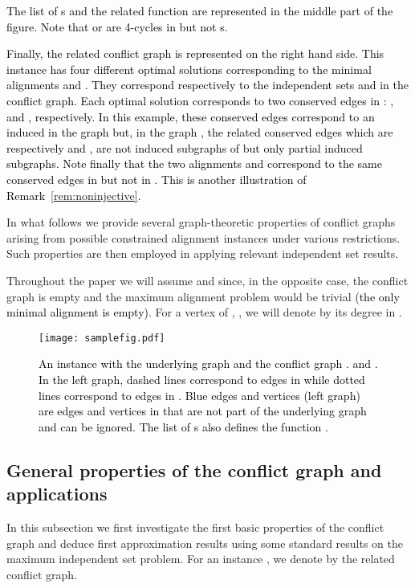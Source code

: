 \documentclass[final]{dmtcs-episciences}
\newcommand\mar[1]{\textcolor{black}{#1}}
\begin{document}
\mar{The list of s and the related function 
are represented in the middle part of the figure.
Note that  or  are 4-cycles in  but not s. }

\mar{Finally, the related conflict graph is represented on the right hand side. 
This instance has four different optimal solutions corresponding to the minimal alignments  and . They correspond respectively to the independent sets  and  in the conflict graph. Each optimal solution corresponds to two conserved edges in : ,  and , respectively. In this example, these conserved edges correspond to an induced  in the graph  but, in the graph , the related conserved edges which are respectively   and , are not induced subgraphs of  but only partial induced subgraphs. Note finally that the two alignments  and  correspond to the same conserved edges in  but not in . This is another illustration of Remark~\ref{rem:noninjective}.} 


In what follows we provide several graph-theoretic properties of conflict graphs
arising from possible constrained alignment instances under various restrictions. 
Such properties are then employed in applying relevant independent set 
results. 

Throughout the paper we will assume  and  since, in the opposite case, the conflict graph is empty and the maximum alignment problem would be trivial \mar{(the only minimal alignment is empty)}. For a vertex  of , , we will denote by  its degree in .

\begin{figure}[t]	   
\begin{center}	   
\texttt{[image: samplefig.pdf]} 
\caption{\sf \mar{An instance  with the underlying graph  and the conflict graph .  and . In the left graph, dashed lines correspond to edges in  while dotted lines correspond to edges in . Blue edges and vertices (left graph) are edges and vertices in  that are not part of the underlying graph and can be ignored. The list of s also defines the function . }
} 
\label{sample}	   
\end{center}	   
\vspace*{-.4cm}	   
\end{figure}


\subsection{General properties of the conflict graph and applications}\label{sec:anym1m2}
In this subsection we first investigate the first basic properties of the conflict graph and deduce first approximation results using some standard results on the maximum independent set problem. For an instance , we denote by  the related conflict graph.
\end{document}
